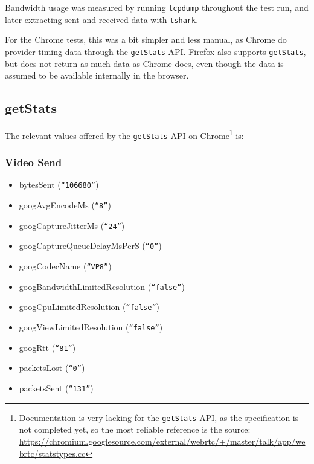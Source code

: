 Bandwidth usage was measured by running \texttt{tcpdump} throughout the test run, and later extracting sent and received data with \texttt{tshark}.

For the Chrome tests, this was a bit simpler and less manual, as Chrome do provider timing data through the \texttt{getStats} API. Firefox also supports \texttt{getStats}, but does not return as much data as Chrome does, even though the data is assumed to be available internally in the browser.




\subsection{getStats}

The relevant values offered by the \texttt{getStats}-API on Chrome\footnote{Documentation is very lacking for the \texttt{getStats}-API, as the specification is not completed yet, so the most reliable reference is the source: \url{https://chromium.googlesource.com/external/webrtc/+/master/talk/app/webrtc/statstypes.cc}} is:

\subsubsection{Video Send}
\begin{itemize}
    \setlength\itemsep{.1em}
    \setlength\parsep{0pt}
    \setlength\parskip{0pt}
    \item bytesSent (\texttt{``106680''})
    \item googAvgEncodeMs (\texttt{``8''})
    \item googCaptureJitterMs (\texttt{``24''})
    \item googCaptureQueueDelayMsPerS (\texttt{``0''})
    \item googCodecName (\texttt{``VP8''})
    \item googBandwidthLimitedResolution (\texttt{``false''})
    \item googCpuLimitedResolution (\texttt{``false''})
    \item googViewLimitedResolution (\texttt{``false''})
    \item googRtt (\texttt{``81''})
    \item packetsLost (\texttt{``0''})
    \item packetsSent (\texttt{``131''})
\end{itemize}

